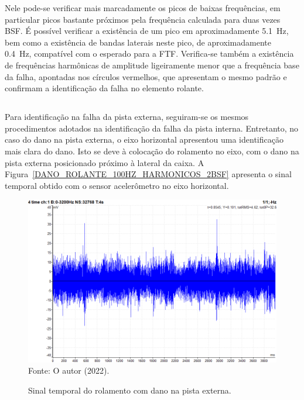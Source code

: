 \documentclass[
	12pt,				
	oneside,			
	a4paper,			
	english,			
	brazil,			
	]{abntex2ppgsi}
\begin{document}
Nele pode-se verificar mais marcadamente os picos de baixas frequências, em particular picos bastante próximos pela frequência calculada para duas vezes BSF. É possível verificar a existência de um pico em aproximadamente \SI{5,1}{\hertz}, bem como a existência de bandas laterais neste pico, de aproximadamente \SI{0,4}{\hertz}, compatível com o esperado para a FTF. Verifica-se também a existência de frequências harmônicas de amplitude ligeiramente menor que a frequência base da falha, apontadas nos círculos vermelhos, que apresentam o mesmo padrão e confirmam a identificação da falha no elemento rolante.

\subsection{}

Para identificação na falha da pista externa, seguiram-se os mesmos procedimentos adotados na identificação da falha da pista interna. Entretanto, no caso do dano na pista externa, o eixo horizontal apresentou uma identificação mais clara do dano. Isto se deve à colocação do rolamento no eixo, com o dano na pista externa posicionado próximo à lateral da caixa. A Figura~\ref{DANO_ROLANTE_100HZ_HARMONICOS_2BSF} apresenta o sinal temporal obtido com o sensor acelerômetro no eixo horizontal.

\begin{figure}[H]
\centering
\caption {Sinal temporal do rolamento com dano na pista externa.}
\includegraphics[width=\textwidth,keepaspectratio]{TEMPO_DEFEITO_EXTERNA_100HZ_COM_CARGA} \\
Fonte: O autor (2022).
\label{TEMPO_DEFEITO_EXTERNA_100HZ_COM_CARGA}
\end{figure}
\end{document}
